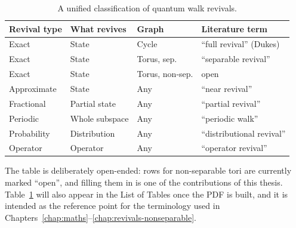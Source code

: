 \begin{table}[htbp]
  \centering
  \caption{A unified classification of quantum walk revivals.}
  \label{tab:taxonomy}
  \begin{tabular}{@{}p{2.3cm}p{2.2cm}p{2.2cm}p{3.8cm}@{}}
    \toprule
    Revival type & What revives & Graph & Literature term \\
    \midrule
    Exact        & State        & Cycle         & ``full revival'' (Dukes) \\
    Exact        & State        & Torus, sep.   & ``separable revival'' \\
    Exact        & State        & Torus, non-sep. & open \\
    Approximate  & State        & Any           & ``near revival'' \\
    Fractional   & Partial state & Any          & ``partial revival'' \\
    Periodic     & Whole subspace & Any         & ``periodic walk'' \\
    Probability  & Distribution & Any           & ``distributional revival'' \\
    Operator     & Operator     & Any           & ``operator revival'' \\
    \bottomrule
  \end{tabular}
\end{table}

The table is deliberately open-ended: rows for non-separable tori are
currently marked ``open'', and filling them in is one of the contributions
of this thesis. Table~\ref{tab:taxonomy} will also appear in the List of
Tables once the PDF is built, and it is intended as the reference point for
the terminology used in Chapters~\ref{chap:maths}--\ref{chap:revivals-nonseparable}.

